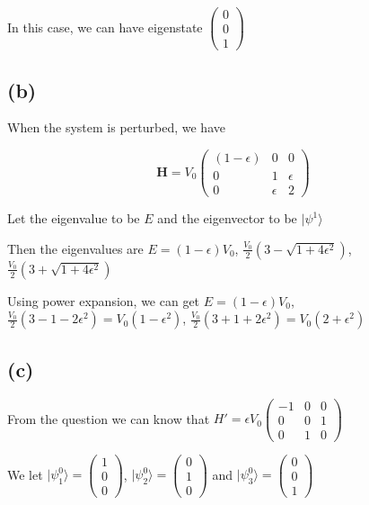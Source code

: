 \documentclass[12pt]{article}
\begin{document}
\begin{spacing}{2.0}
In this case, we can have eigenstate $\left(
\begin{array}{c}
0 \\
0 \\
1
\end{array}
\right)$

\subsection*{(b)}
When the system is perturbed, we have

$$\mathbf{H}=V_0\left(
\begin{array}{ccc}
(1-\epsilon) & 0 & 0 \\
0 & 1 & \epsilon \\
0 & \epsilon & 2
\end{array}
\right)$$

Let the eigenvalue to be $E$ and the eigenvector to be $|\psi^1\rangle$

Then the eigenvalues are $E=(1-\epsilon)V_0$, $\frac{V_0}{2} (3-\sqrt{1+4\epsilon^2})$, $\frac{V_0}{2} (3+\sqrt{1+4\epsilon^2})$

Using power expansion, we can get $E=(1-\epsilon)V_0$, $\frac{V_0}{2} (3-1-2\epsilon^2)= V_0(1-\epsilon^2)$, $\frac{V_0}{2} (3+1+2\epsilon^2)=V_0(2+\epsilon^2)$

\subsection*{(c)}
From the question we can know that $H'=\epsilon V_0 \left(
\begin{array}{ccc}
-1 & 0 & 0 \\
0  & 0 & 1 \\
0  & 1 & 0
\end{array}
\right)
$

We let $|\psi_1^0\rangle=\left(
\begin{array}{c}
1 \\
0 \\
0
\end{array}
\right)$, $|\psi_2^0\rangle=\left(
\begin{array}{c}
0 \\
1 \\
0
\end{array}
\right)$ and $|\psi_3^0\rangle=\left(
\begin{array}{c}
0 \\
0 \\
1
\end{array}
\right)$


\end{spacing}
\end{document}
